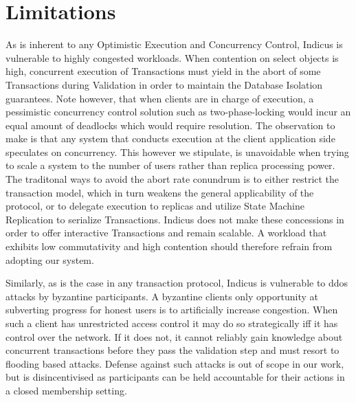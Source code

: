 \section{Limitations}
As is inherent to any Optimistic Execution and Concurrency Control, Indicus is vulnerable to highly congested workloads. When contention on select objects is high, concurrent execution of Transactions must yield in the abort of some Transactions during Validation in order to maintain the Database Isolation guarantees. Note however, that when clients are in charge of execution, a pessimistic concurrency control solution such as two-phase-locking would incur an equal amount of deadlocks which would require resolution. The observation to make is that any system that conducts execution at the client application side speculates on concurrency. This however we stipulate, is unavoidable when trying to scale a system to the number of users rather than replica processing power. The traditonal ways to avoid the abort rate conundrum is to either restrict the transaction model, which in turn weakens the general applicability of the protocol, or to delegate execution to replicas and utilize State Machine Replication to serialize Transactions. Indicus does not make these concessions in order to offer interactive Transactions and remain scalable. A workload that exhibits low commutativity and high contention should therefore refrain from adopting our system.

Similarly, as is the case in any transaction protocol, Indicus is vulnerable to ddos attacks by byzantine participants. A byzantine clients only opportunity at subverting progress for honest users is to artificially increase congestion. When such a client has unrestricted access control it may do so strategically iff it has control over the network. If it does not, it cannot reliably gain knowledge about concurrent transactions before they pass the validation step and must resort to flooding based attacks. Defense against such attacks is out of scope in our work, but is disincentivised as participants can be held accountable for their actions in a closed membership setting.


